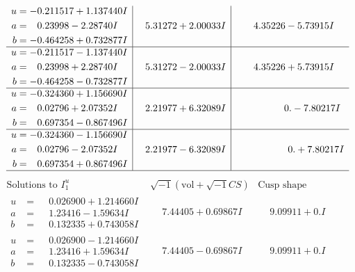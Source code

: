 \documentclass[1p]{elsarticle_modified}
\theoremstyle{definition}
\newcommand{\I}{\sqrt{-1}}
\begin{document}
$$\begin{array}{c|c|c}
\begin{aligned}
u &= -0.211517 + 1.137440 I \\
a &= \phantom{-}0.23998 - 2.28740 I \\
b &= -0.464258 + 0.732877 I\end{aligned}
 & \phantom{-}5.31272 + 2.00033 I & \phantom{-}4.35226 - 5.73915 I \\ \hline\begin{aligned}
u &= -0.211517 - 1.137440 I \\
a &= \phantom{-}0.23998 + 2.28740 I \\
b &= -0.464258 - 0.732877 I\end{aligned}
 & \phantom{-}5.31272 - 2.00033 I & \phantom{-}4.35226 + 5.73915 I \\ \hline\begin{aligned}
u &= -0.324360 + 1.156690 I \\
a &= \phantom{-}0.02796 + 2.07352 I \\
b &= \phantom{-}0.697354 - 0.867496 I\end{aligned}
 & \phantom{-}2.21977 + 6.32089 I & \phantom{-0.000000 } 0. - 7.80217 I \\ \hline\begin{aligned}
u &= -0.324360 - 1.156690 I \\
a &= \phantom{-}0.02796 - 2.07352 I \\
b &= \phantom{-}0.697354 + 0.867496 I\end{aligned}
 & \phantom{-}2.21977 - 6.32089 I & \phantom{-0.000000 -}0. + 7.80217 I\\
 \hline 
 \end{array}$$\newpage$$\begin{array}{c|c|c}  
\text{Solutions to }I^u_{1}& \I (\text{vol} + \sqrt{-1}CS) & \text{Cusp shape}\\
 \hline 
\begin{aligned}
u &= \phantom{-}0.026900 + 1.214660 I \\
a &= \phantom{-}1.23416 - 1.59634 I \\
b &= \phantom{-}0.132335 + 0.743058 I\end{aligned}
 & \phantom{-}7.44405 + 0.69867 I & \phantom{-}9.09911 + 0. I\phantom{ +0.000000I} \\ \hline\begin{aligned}
u &= \phantom{-}0.026900 - 1.214660 I \\
a &= \phantom{-}1.23416 + 1.59634 I \\
b &= \phantom{-}0.132335 - 0.743058 I\end{aligned}
 & \phantom{-}7.44405 - 0.69867 I & \phantom{-}9.09911 + 0. I\phantom{ +0.000000I} \\ \hline\begin{aligned}

\end{aligned}
\end{array}$$
\end{document}

